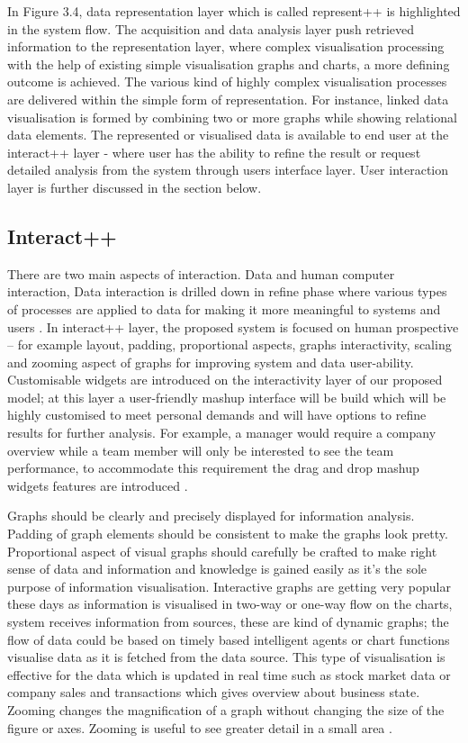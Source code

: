 In Figure 3.4, data representation layer which is called represent++ is highlighted in the system flow. The acquisition and data analysis layer push retrieved information to the representation layer, where complex visualisation processing with the help of existing simple visualisation graphs and charts, a more defining outcome is achieved. The various kind of highly complex visualisation processes are delivered within the simple form of representation. For instance, linked data visualisation is formed by combining two or more graphs while showing relational data elements. The represented or visualised data is available to end user at the interact++ layer - where user has the ability to refine the result or request detailed analysis from the system through users interface layer. User interaction layer is further discussed in the section below.\\

\subsection{Interact++}

There are two main aspects of interaction. Data and human computer interaction, Data interaction is drilled down in refine phase where various types of processes are applied to data for making it more meaningful to systems and users \cite{hix1993developing}. In interact++ layer, the proposed system is focused on human prospective – for example layout, padding, proportional aspects, graphs interactivity, scaling and zooming aspect of graphs for improving system and data user-ability. Customisable widgets are introduced on the interactivity layer of our proposed model; at this layer a user-friendly mashup interface will be build which will be highly customised to meet personal demands and will have options to refine results for further analysis. For example, a manager would require a company overview while a team member will only be interested to see the team performance, to accommodate this requirement the drag and drop mashup widgets features are introduced \cite{wu2010widgetizing}. 

Graphs should be clearly and precisely displayed for information analysis. Padding of graph elements should be consistent to make the graphs look pretty. Proportional aspect of visual graphs should carefully be crafted to make right sense of data and information and knowledge is gained easily as it’s the sole purpose of information visualisation. Interactive graphs are getting very popular these days as information is visualised in two-way or one-way flow on the charts, system receives information from sources, these are kind of dynamic graphs; the flow of data could be based on timely based intelligent agents or chart functions visualise data as it is fetched from the data source. This type of visualisation is effective for the data which is updated in real time such as stock market data or company sales and transactions which gives overview about business state. Zooming changes the magnification of a graph without changing the size of the figure or axes. Zooming is useful to see greater detail in a small area \cite{ondov2011interactive}. 

